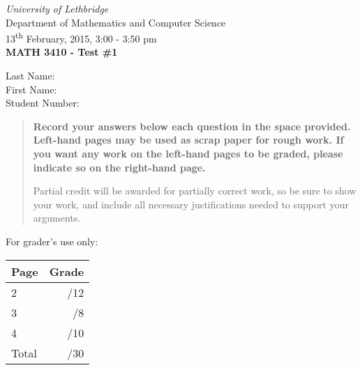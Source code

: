 \documentclass[12pt]{article}
\newcommand{\skipline}{\vspace{12pt}}
\begin{document}
\author{Instructor: Sean Fitzpatrick}
\thispagestyle{plain}
\begin{center}
\emph{University of Lethbridge}\\
Department of Mathematics and Computer Science\\
13\textsuperscript{th} February, 2015, 3:00 - 3:50 pm\\
{\bf MATH 3410 - Test \#1}\\
\end{center}
\skipline \skipline \skipline \noindent \skipline
Last Name:\underline{\hspace{353pt}}\\
\skipline
First Name:\underline{\hspace{350pt}}\\
\skipline
Student Number:\underline{\hspace{323pt}}\\
\skipline



\vspace{0.5in}


\begin{quote}
 {\bf Record your answers below each question in the space provided.    Left-hand pages may be used as scrap paper for rough work.  If you want any work on the left-hand pages to be graded, please indicate so on the right-hand page.
 
 \bigskip
 
Partial credit will be awarded for partially correct work, so be sure to show your work, and include all necessary justifications needed to support your arguments.}
\end{quote}


\vspace{0.5in}

For grader's use only:

\begin{table}[hbt]
\begin{center}
\begin{tabular}{|l|r|} \hline
Page&Grade\\
\hline \hline
\cline{1-2} 2 & \enspace\enspace\enspace\enspace\enspace\enspace/12\\
\cline{1-2} 3 & \enspace\enspace\enspace\enspace\enspace\enspace/8\\
\cline{1-2} 4 & \enspace\enspace\enspace\enspace\enspace\enspace/10\\
\cline{1-2} Total & \enspace\enspace\enspace\enspace\enspace\enspace/30\\
\hline
\end{tabular}




\end{center}
\end{table}
\newpage
\end{document}
